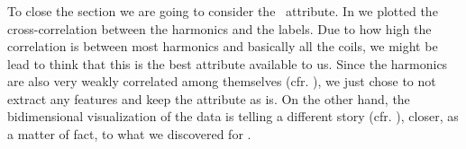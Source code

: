 \subsubsection{\phin}
To close the section we are going to consider the \phin\ attribute. In  we
plotted the cross-correlation between the harmonics and the labels. Due to how high the correlation
is between most harmonics and basically all the coils, we might be lead to think that this is the
best attribute available to us. Since the harmonics are also very weakly correlated among themselves
(cfr. ), we just chose to not extract any features and keep the attribute as is.
On the other hand, the bidimensional visualization of the data is telling a different story (cfr.
), closer, as a matter of fact, to what we discovered for \bn.

